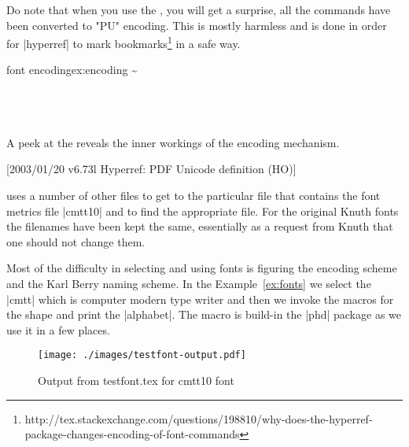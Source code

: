 Do note that when you use the , you will get a surprise, all the commands have been converted to "PU" encoding. This is mostly harmless and is  done in order for |hyperref| to mark bookmarks\footnote{http://tex.stackexchange.com/questions/198810/why-does-the-hyperref-package-changes-encoding-of-font-commands} in a safe way.

\begin{texexample}{font encoding}{ex:encoding}
\meaning\textasciitilde\\
\meaning\"\\
\meaning\NG\\
\meaning\k\\
\meaning\alpha
\meaning\printfontparams

\printfontparams
\end{texexample}

A peek at the  reveals the inner workings
of the encoding mechanism.

\begin{phdverbatim}
  [2003/01/20 v6.73l
  Hyperref: PDF Unicode definition (HO)]
\end{phdverbatim}

\printfontparams 


\latex uses a number of other files to get to the particular file that contains the font metrics file |cmtt10| and to find the appropriate file. For the original Knuth fonts the filenames have been kept the same, essentially as a request from Knuth that one should not change them.

Most of the difficulty in selecting and using fonts is figuring the encoding scheme and the Karl Berry naming scheme. In the Example~\ref{ex:fonts} we select the  |cmtt| which is computer modern type writer and then we invoke the macros for the shape  and print the |alphabet|. The macro \cmd{\alphabet} is build-in the |phd| package as we use it in a few places.

\begin{figure}[htbp]
\centering

\hspace*{-2cm}\texttt{[image: ./images/testfont-output.pdf]}

\caption{Output from testfont.tex for cmtt10 font}
\label{fig:fonttest}
\end{figure}



